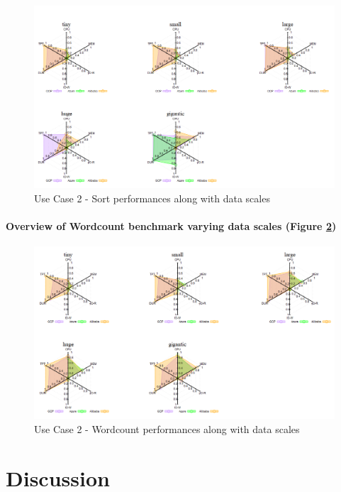\documentclass[review]{elsarticle}
\begin{document}
\begin{figure}[p]
	\caption{Use Case 2 - Sort performances along with data scales}
	\label{fig:uc2-srt}
	\includegraphics[width=\textwidth]{uc2-srt}
	\centering
\end{figure}

\paragraph{Overview of Wordcount benchmark varying data scales (Figure \ref{fig:uc2-wrdcnt})}

\begin{figure}[p]
	\caption{Use Case 2 - Wordcount performances along with data scales}
	\label{fig:uc2-wrdcnt}
	\includegraphics[width=\textwidth]{uc2-wrdcnt}
	\centering
\end{figure}



\section{Discussion}
\end{document}
